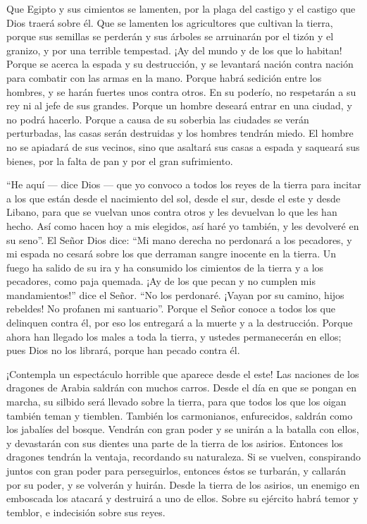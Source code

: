  Que Egipto y sus cimientos se lamenten, por la plaga del
castigo y el castigo que Dios traerá sobre él.  Que se
lamenten los agricultores que cultivan la tierra, porque sus semillas se
perderán y sus árboles se arruinarán por el tizón y el granizo, y por
una terrible tempestad.  ¡Ay del mundo y de los que lo
habitan!  Porque se acerca la espada y su destrucción, y
se levantará nación contra nación para combatir con las armas en la
mano.  Porque habrá sedición entre los hombres, y se
harán fuertes unos contra otros. En su poderío, no respetarán a su rey
ni al jefe de sus grandes.  Porque un hombre deseará
entrar en una ciudad, y no podrá hacerlo.  Porque a causa
de su soberbia las ciudades se verán perturbadas, las casas serán
destruidas y los hombres tendrán miedo.  El hombre no se
apiadará de sus vecinos, sino que asaltará sus casas a espada y saqueará
sus bienes, por la falta de pan y por el gran sufrimiento.

 ``He aquí --- dice Dios --- que yo convoco a todos los
reyes de la tierra para incitar a los que están desde el nacimiento del
sol, desde el sur, desde el este y desde Libano, para que se vuelvan
unos contra otros y les devuelvan lo que les han hecho. 
Así como hacen hoy a mis elegidos, así haré yo también, y les devolveré
en su seno''. El Señor Dios dice:  ``Mi mano derecha no
perdonará a los pecadores, y mi espada no cesará sobre los que derraman
sangre inocente en la tierra.  Un fuego ha salido de su
ira y ha consumido los cimientos de la tierra y a los pecadores, como
paja quemada.  ¡Ay de los que pecan y no cumplen mis
mandamientos!'' dice el Señor.  ``No los perdonaré.
¡Vayan por su camino, hijos rebeldes! No profanen mi santuario''.
 Porque el Señor conoce a todos los que delinquen contra
él, por eso los entregará a la muerte y a la destrucción.
 Porque ahora han llegado los males a toda la tierra, y
ustedes permanecerán en ellos; pues Dios no los librará, porque han
pecado contra él.

 ¡Contempla un espectáculo horrible que aparece desde el
este!  Las naciones de los dragones de Arabia saldrán con
muchos carros. Desde el día en que se pongan en marcha, su silbido será
llevado sobre la tierra, para que todos los que los oigan también teman
y tiemblen.  También los carmonianos, enfurecidos,
saldrán como los jabalíes del bosque. Vendrán con gran poder y se unirán
a la batalla con ellos, y devastarán con sus dientes una parte de la
tierra de los asirios.  Entonces los dragones tendrán la
ventaja, recordando su naturaleza. Si se vuelven, conspirando juntos con
gran poder para perseguirlos,  entonces éstos se
turbarán, y callarán por su poder, y se volverán y huirán.
 Desde la tierra de los asirios, un enemigo en emboscada
los atacará y destruirá a uno de ellos. Sobre su ejército habrá temor y
temblor, e indecisión sobre sus reyes.

